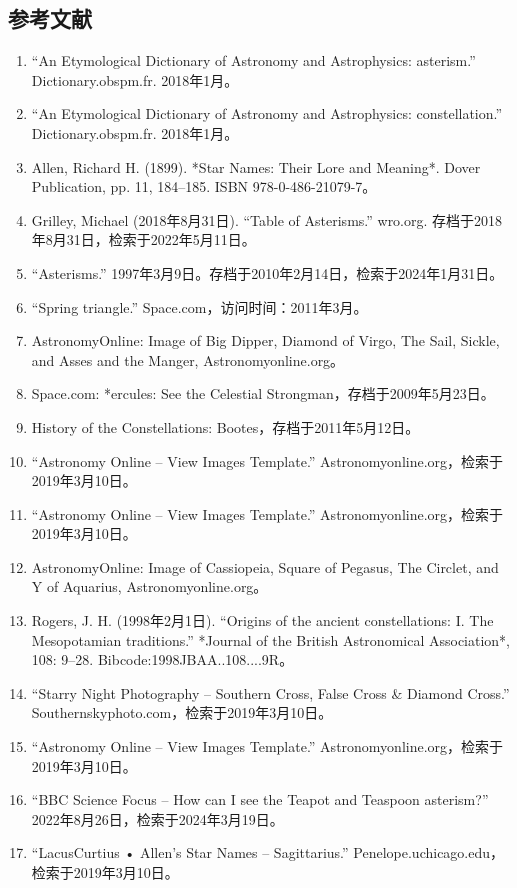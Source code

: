 \subsection{参考文献}
\begin{enumerate}
\item “An Etymological Dictionary of Astronomy and Astrophysics: asterism.” Dictionary.obspm.fr. 2018年1月。
\item “An Etymological Dictionary of Astronomy and Astrophysics: constellation.” Dictionary.obspm.fr. 2018年1月。
\item Allen, Richard H. (1899). *Star Names: Their Lore and Meaning*. Dover Publication, pp. 11, 184–185. ISBN 978-0-486-21079-7。
\item Grilley, Michael (2018年8月31日). “Table of Asterisms.” wro.org. 存档于2018年8月31日，检索于2022年5月11日。
\item “Asterisms.” 1997年3月9日。存档于2010年2月14日，检索于2024年1月31日。
\item “Spring triangle.” Space.com，访问时间：2011年3月。
\item AstronomyOnline: Image of Big Dipper, Diamond of Virgo, The Sail, Sickle, and Asses and the Manger, Astronomyonline.org。
\item Space.com: *ercules: See the Celestial Strongman，存档于2009年5月23日。
\item History of the Constellations: Bootes，存档于2011年5月12日。
\item “Astronomy Online – View Images Template.” Astronomyonline.org，检索于2019年3月10日。
\item “Astronomy Online – View Images Template.” Astronomyonline.org，检索于2019年3月10日。
\item AstronomyOnline: Image of Cassiopeia, Square of Pegasus, The Circlet, and Y of Aquarius, Astronomyonline.org。
\item Rogers, J. H. (1998年2月1日). “Origins of the ancient constellations: I. The Mesopotamian traditions.” *Journal of the British Astronomical Association*, 108: 9–28. Bibcode:1998JBAA..108....9R。
\item “Starry Night Photography – Southern Cross, False Cross & Diamond Cross.” Southernskyphoto.com，检索于2019年3月10日。
\item “Astronomy Online – View Images Template.” Astronomyonline.org，检索于2019年3月10日。
\item “BBC Science Focus – How can I see the Teapot and Teaspoon asterism?” 2022年8月26日，检索于2024年3月19日。
\item “LacusCurtius • Allen's Star Names – Sagittarius.” Penelope.uchicago.edu，检索于2019年3月10日。

\end{enumerate}
